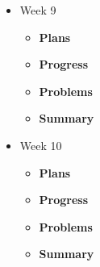 \begin{itemize}
		\item{Week 9}
			\begin{itemize}
				\item \textbf{Plans} \\
				\item \textbf{Progress} \\
				\item \textbf{Problems} \\
				\item \textbf{Summary} \\
			\end{itemize}

		\item{Week 10}
			\begin{itemize}
				\item \textbf{Plans} \\
				\item \textbf{Progress} \\
				\item \textbf{Problems} \\
				\item \textbf{Summary} \\
			\end{itemize}

	\end{itemize}

	\pagebreak
